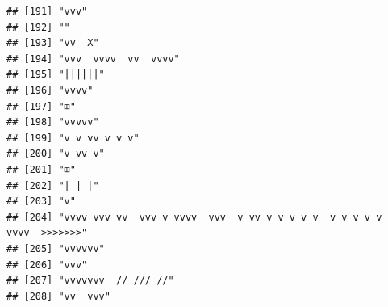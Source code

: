 \documentclass[
]{article}
\begin{document}
\begin{verbatim}
## [191] "vvv"                                                                                                                                      
## [192] ""                                                                                                                                         
## [193] "vv  X"                                                                                                                                    
## [194] "vvv  vvvv  vv  vvvv"                                                                                                                      
## [195] "||||||"                                                                                                                                   
## [196] "vvvv"                                                                                                                                     
## [197] "⊞"                                                                                                                                        
## [198] "vvvvv"                                                                                                                                    
## [199] "v v vv v v v"                                                                                                                             
## [200] "v vv v"                                                                                                                                   
## [201] "⊞"                                                                                                                                        
## [202] "| | |"                                                                                                                                    
## [203] "v"                                                                                                                                        
## [204] "vvvv vvv vv  vvv v vvvv  vvv  v vv v v v v v  v v v v v  vvvv  >>>>>>>"                                                                   
## [205] "vvvvvv"                                                                                                                                   
## [206] "vvv"                                                                                                                                      
## [207] "vvvvvvv  // /// //"                                                                                                                       
## [208] "vv  vvv"                                                                                                                                  

\end{verbatim}
\end{document}
